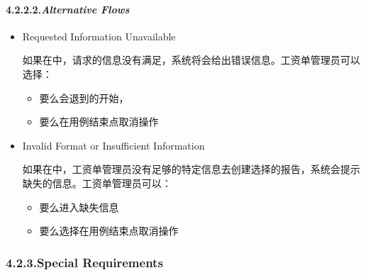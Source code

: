 \documentclass{article}
\begin{document}
\paragraph{4.2.2.2.\hspace*{0.5em}\emph{Alternative Flows}}\label{sec-_alternative-flows_}%

\begin{itemize}%

\item{}
Requested Information Unavailable%

如果在中，请求的信息没有满足，系统将会给出错误信息。工资单管理员可以选择：%

\begin{itemize}[noitemsep,topsep=\mdcompacttopsep]%

\item{}要么会退到的开始，%

\item{}要么在用例结束点取消操作%
\end{itemize}%

\item{}
Invalid Format or Insufficient Information%

如果在中，工资单管理员没有足够的特定信息去创建选择的报告，系统会提示缺失的信息。工资单管理员可以：%

\begin{itemize}[noitemsep,topsep=\mdcompacttopsep]%

\item{}要么进入缺失信息%

\item{}要么选择在用例结束点取消操作%
\end{itemize}%
\end{itemize}%

\subsubsection{4.2.3.\hspace*{0.5em}Special Requirements}\label{sec-special-requirements}%
\end{document}
